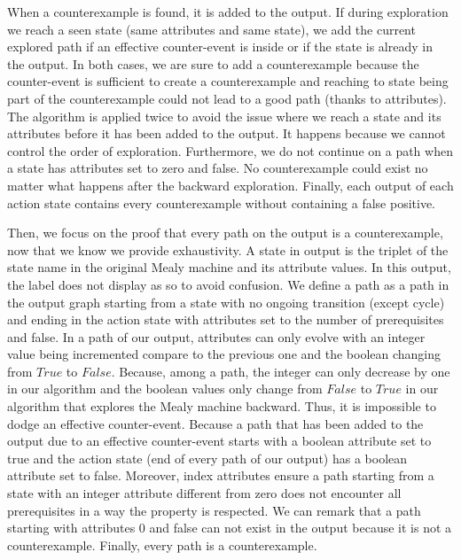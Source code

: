 When a counterexample is found, it is added to the output.
If during exploration we reach a seen state (same attributes and same state), we add the current explored path if an effective counter-event is inside or if the state is already in the output. 
In both cases, we are sure to add a counterexample because the counter-event is sufficient to create a counterexample and reaching to state being part of the counterexample could not lead to a good path (thanks to attributes). 
The algorithm is applied twice to avoid the issue where we reach a state and its attributes before it has been added to the output.
It happens because we cannot control the order of exploration.
Furthermore, we do not continue on a path when a state has attributes set to zero and false.
No counterexample could exist no matter what happens after the backward exploration.
Finally, each output of each action state contains every counterexample without containing a false positive. 






Then, we focus on the proof that every path on the output is a counterexample, now that we know we provide exhaustivity.
A state in output is the triplet of the state name in the original Mealy machine and its attribute values.
In this output, the label does not display as so to avoid confusion.
We define a path as a path in the output graph starting from a state with no ongoing transition (except cycle) and ending in the action state with attributes set to the number of prerequisites and false.
In a path of our output, attributes can only evolve with an integer value being incremented compare to the previous one and the boolean changing from $True$ to $False$. 
Because, among a path, the integer can only decrease by one in our algorithm and the boolean values only change from $False$ to $True$ in our algorithm that explores the Mealy machine backward.
Thus, it is impossible to dodge an effective counter-event.
Because a path that has been added to the output due to an effective counter-event starts with a boolean attribute set to true and the action state (end of every path of our output) has a boolean attribute set to false. 
Moreover, index attributes ensure a path starting from a state with an integer attribute different from zero does not encounter all prerequisites in a way the property is respected. 
We can remark that a path starting with attributes 0 and false can not exist in the output because it is not a counterexample.
Finally, every path is a counterexample.




